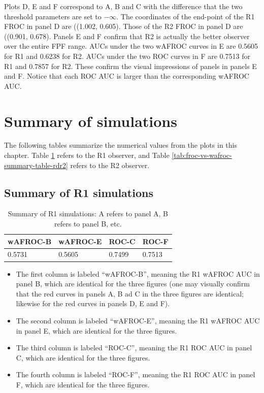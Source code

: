 \documentclass[
]{book}
\providecommand{\tightlist}{%
  \setlength{\itemsep}{0pt}\setlength{\parskip}{0pt}}
\begin{document}
Plots D, E and F correspond to A, B and C with the difference that the two threshold parameters are set to \(-\infty\). The coordinates of the end-point of the R1 FROC in panel D are ((1.002, 0.605). Those of the R2 FROC in panel D are ((0.901, 0.678). Panels E and F confirm that R2 is actually the better observer over the entire FPF range. AUCs under the two wAFROC curves in E are 0.5605 for R1 and 0.6238 for R2. AUCs under the two ROC curves in F are 0.7513 for R1 and 0.7857 for R2. These confirm the visual impressions of panels in panels E and F. Notice that each ROC AUC is larger than the corresponding wAFROC AUC.

\hypertarget{summary-of-simulations}{%
\section{Summary of simulations}\label{summary-of-simulations}}

The following tables summarize the numerical values from the plots in this chapter. Table \ref{tab:froc-vs-wafroc-summary-table-rdr1} refers to the R1 observer, and Table \ref{tab:froc-vs-wafroc-summary-table-rdr2} refers to the R2 observer.

\hypertarget{summary-of-r1-simulations}{%
\subsection{Summary of R1 simulations}\label{summary-of-r1-simulations}}

\begin{table}

\caption{\label{tab:froc-vs-wafroc-summary-table-rdr1}Summary of R1 simulations: A refers to panel A, B refers to panel B, etc.}
\centering
\begin{tabular}[t]{l|l|l|l}
\hline
wAFROC-B & wAFROC-E & ROC-C & ROC-F\\
\hline
0.5731 & 0.5605 & 0.7499 & 0.7513\\
\hline
\end{tabular}
\end{table}

\begin{itemize}
\tightlist
\item
  The first column is labeled ``wAFROC-B'', meaning the R1 wAFROC AUC in panel B, which are identical for the three figures (one may visually confirm that the red curves in panels A, B ad C in the three figures are identical; likewise for the red curves in panels D, E and F).
\item
  The second column is labeled ``wAFROC-E'', meaning the R1 wAFROC AUC in panel E, which are identical for the three figures.
\item
  The third column is labeled ``ROC-C'', meaning the R1 ROC AUC in panel C, which are identical for the three figures.
\item
  The fourth column is labeled ``ROC-F'', meaning the R1 ROC AUC in panel F, which are identical for the three figures.
\end{itemize}
\end{document}
